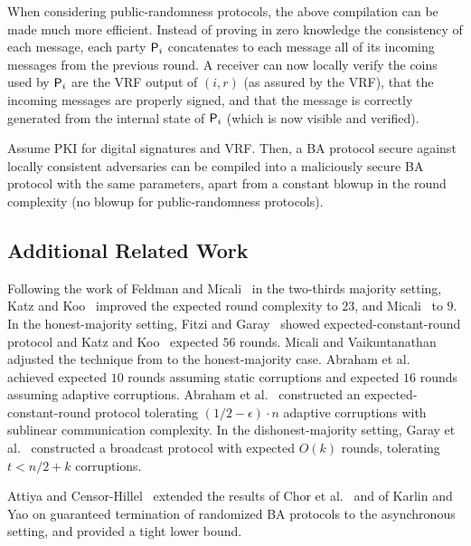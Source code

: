 When considering public-randomness protocols, the above compilation can be made much more efficient. Instead of proving in zero knowledge the consistency of each message, each party $\mathsf{P}_i$ concatenates to each message all of its incoming messages from the previous round. A receiver can now locally verify the coins used by $\mathsf{P}_i$ are the VRF output of $(i,r)$ (as assured by the VRF), that the incoming messages are properly signed, and that the message is correctly generated from the internal state of $\mathsf{P}_i$ (which is now visible and verified).

\begin{theorem}\label{thm:local_to_malicious}
Assume PKI for digital signatures and VRF. Then, a BA protocol secure against locally consistent adversaries can be compiled into a maliciously secure BA protocol with the same parameters, apart from a constant blowup in the round complexity (no blowup for public-randomness protocols).
\end{theorem}

\subsection{Additional Related Work}\label{sec:relatedWork}

Following the work of Feldman and Micali~\cite{FM97} in the two-thirds majority setting, Katz and Koo~\cite{KK06} improved the expected round complexity to $23$, and Micali~\cite{Micali17} to $9$. In the honest-majority setting, Fitzi and Garay~\cite{FG03} showed expected-constant-round protocol and Katz and Koo~\cite{KK06} expected $56$ rounds. Micali and Vaikuntanathan \cite{MV17} adjusted the technique from \cite{Micali17} to the honest-majority case. Abraham et al.~\cite{ADDNR19} achieved expected $10$ rounds assuming static corruptions and expected $16$ rounds assuming adaptive corruptions. Abraham et al.~\cite{ACDNPRS19} constructed an expected-constant-round protocol tolerating $(1/2-\epsilon)\cdot n$ adaptive corruptions with sublinear communication complexity. In the dishonest-majority setting, Garay et al.~\cite{GKKO07} constructed a broadcast protocol with expected $O(k)$ rounds, tolerating $t<n/2+k$ corruptions.

Attiya and Censor-Hillel~\cite{AH10} extended the results of  Chor et al.~\cite{CMS89} and of  Karlin and Yao \cite{KY86} on guaranteed termination of randomized BA protocols to the asynchronous setting, and provided a tight lower bound.

